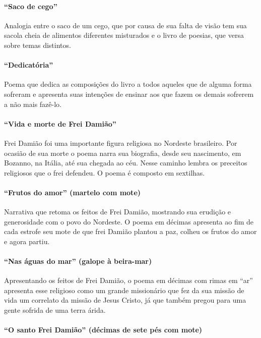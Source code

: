 \paragraph{``Saco de cego''}

Analogia entre o saco de um cego, que por causa de sua falta de visão
tem sua sacola cheia de alimentos diferentes misturados e o livro de
poesias, que versa sobre temas distintos.

\paragraph{``Dedicatória''}

Poema que dedica as composições do livro a todos aqueles que de alguma
forma sofreram e apresenta suas intenções de ensinar aos que fazem os
demais sofrerem a não mais fazê-lo.

\paragraph{``Vida e morte de Frei Damião''}

Frei Damião foi uma importante figura religiosa no Nordeste brasileiro.
Por ocasião de sua morte o poema narra sua biografia, desde seu nascimento,
em Bozanno, na Itália, até sua chegada ao céu. Nesse caminho lembra os
preceitos religiosos que o frei defendeu. O poema é composto em
sextilhas.

\paragraph{``Frutos do amor'' (martelo com mote)}

Narrativa que retoma os feitos de Frei Damião, mostrando sua erudição e
generosidade com o povo do Nordeste. O poema em décimas apresenta ao
fim de cada estrofe seu mote de que frei Damião plantou a paz, colheu
os frutos do amor e agora partiu.

\paragraph{``Nas águas do mar'' (galope à beira-mar)}

Apresentando os feitos de Frei Damião, o poema em décimas com rimas em
``ar'' apresenta esse religioso como
um grande missionário que fez da sua missão de vida um correlato da missão de
Jesus Cristo, já que também pregou para uma gente sofrida de uma terra
árida.

\paragraph{``O santo Frei Damião'' (décimas de sete pés com mote)}


